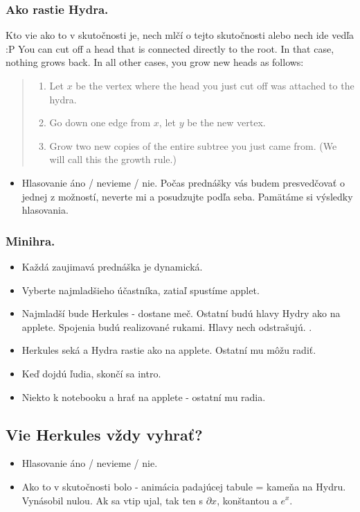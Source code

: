 \documentclass[12pt,a4paper]{article}
\begin{document}
\subsubsection*{Ako rastie Hydra.}
Kto vie ako to v skutočnosti je, nech mlčí o tejto skutočnosti alebo nech ide vedľa :P
You can cut off a head that is connected directly to the root. In that case, nothing grows back. In all other cases, you grow new heads as follows:
\begin{quote}
  \begin{enumerate} 
    \item Let $x$ be the vertex where the head you just cut off was attached to the hydra.
    \item Go down one edge from $x$, let $y$ be the new vertex.
    \item Grow two new copies of the entire subtree you just came from. (We will call this the growth rule.)
  \end{enumerate} 
\end{quote} 

\begin{itemize} 
\item Hlasovanie áno / nevieme / nie. Počas prednášky vás budem presvedčovať o jednej z možností, neverte mi a posudzujte podľa seba. Pamätáme si výsledky hlasovania. 
\end{itemize}

\subsubsection*{Minihra.} 
\begin{itemize}
\item Každá zaujimavá prednáška je dynamická. 
\item Vyberte najmladšieho účastníka, zatiaľ spustíme applet.
\item Najmladší bude Herkules - dostane meč. Ostatní budú hlavy Hydry ako na applete. Spojenia budú realizované rukami. Hlavy nech odstrašujú. .  
\item Herkules seká a Hydra rastie ako na applete. Ostatní mu môžu radiť. 
\item Keď dojdú ľudia, skončí sa intro. 
\item Niekto k notebooku a hrať na applete - ostatní mu radia. 
\end{itemize} 

\subsection*{Vie Herkules vždy vyhrať?}
\begin{itemize}
\item Hlasovanie áno / nevieme / nie. 
\item Ako to v skutočnosti bolo - animácia padajúcej tabule = kameňa na Hydru. Vynásobil nulou. Ak sa vtip ujal, tak ten s $\partial x$, konštantou a $e^x$. 
\end{itemize} 
\end{document}
